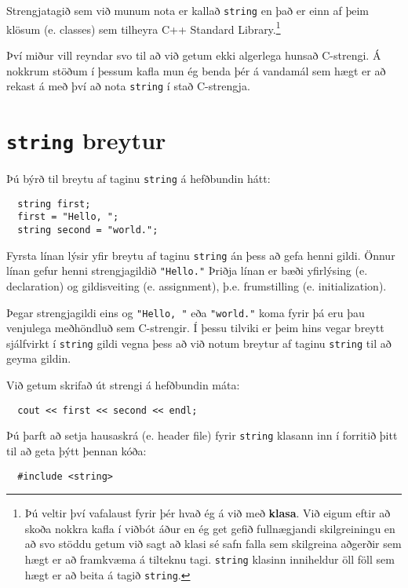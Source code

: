 Strengjatagið sem við munum nota er kallað {\tt string} en það er einn af þeim klösum (e. classes) sem tilheyra C++ Standard Library.\footnote{Þú veltir því vafalaust fyrir þér hvað ég á við með {\bf klasa}. Við eigum eftir að skoða nokkra kafla í viðbót áður en ég get gefið fullnægjandi skilgreiningu
en að svo stöddu getum við sagt að klasi sé safn falla sem skilgreina aðgerðir sem hægt er að framkvæma á tilteknu tagi.
{\tt string} klasinn inniheldur öll föll sem hægt er að beita á tagið {\tt string}.}

Því miður vill reyndar svo til að við getum ekki algerlega hunsað C-strengi.
Á nokkrum stöðum í þessum kafla mun ég benda þér á vandamál sem hægt er að rekast á með því að nota {\tt string} í stað C-strengja.

\section{{\tt string} breytur}

Þú býrð til breytu af taginu {\tt string} á hefðbundin hátt:

\begin{verbatim}
  string first;
  first = "Hello, ";
  string second = "world.";
\end{verbatim}
%
Fyrsta línan lýsir yfir breytu af taginu {\tt string} án þess að gefa henni gildi.
Önnur línan gefur henni strengjagildið \verb+"Hello."+
Þriðja línan er bæði yfirlýsing (e. declaration) og gildisveiting (e. assignment), þ.e. frumstilling (e. initialization).

Þegar strengjagildi eins og \verb+"Hello, "+ eða \verb+"world."+ koma fyrir þá eru þau venjulega meðhöndluð sem C-strengir.
Í þessu tilviki er þeim hins vegar breytt sjálfvirkt í {\tt string} gildi vegna þess að við notum breytur af taginu {\tt string} til að geyma gildin.

Við getum skrifað út strengi á hefðbundin máta: 

\begin{verbatim}
  cout << first << second << endl;
\end{verbatim}
%

Þú þarft að setja hausaskrá (e. header file) fyrir {\tt string} klasann inn í forritið þitt til að geta þýtt þennan kóða:
\begin{verbatim}
  #include <string>
\end{verbatim}


